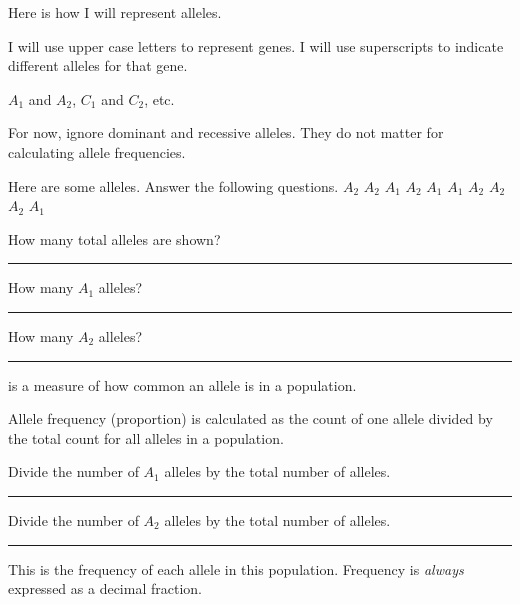 \documentclass[t,handout]{beamer}  %
\begin{document}
\begin{frame}[t]{Here is how I will represent alleles.}

	\hangpara  I will use upper case letters to represent genes. I will use superscripts to indicate different alleles for that gene. 
		
	\hangpara $A_1$ and $A_2$, $C_1$ and $C_2$, etc.
	
	\hangpara For now, ignore dominant and recessive alleles. They do not matter for calculating allele frequencies.
%	
%	
%	
%	
%	
\end{frame}
%
\begin{frame}{Here are some alleles. Answer the following questions.}
	\hfil $A_2$ \quad $A_2$ \quad $A_1$ \quad $A_2$ \quad $A_1$ \quad $A_1$ \quad $A_2$ \quad $A_2$ \quad $A_2$ \quad $A_1$ \hfil
	
	\vspace*{2\baselineskip}
		
	\hangpara How many total alleles are shown? \rule{0.5in}{0.4pt}
	
	\hangpara How many $A_1$ alleles? \rule{0.5in}{0.4pt}
	
	\hangpara How many $A_2$ alleles? \rule{0.5in}{0.4pt}
	
\end{frame}
%
\begin{frame}[t]{ is a measure of how common an allele is in a population.}
	
	
	\hangpara Allele frequency (proportion) is calculated as the count of one allele divided by the total count for all alleles in a population.
	
	\hangpara Divide the number of $A_1$ alleles by the total number of alleles. \rule{0.5in}{0.4pt}
	
	\hangpara Divide the number of $A_2$ alleles by the total number of alleles. \rule{0.5in}{0.4pt}
	
	\hangpara This is the frequency of each allele in this population. Frequency is \emph{always} expressed as a decimal fraction.
	 
\end{frame}
\end{document}
